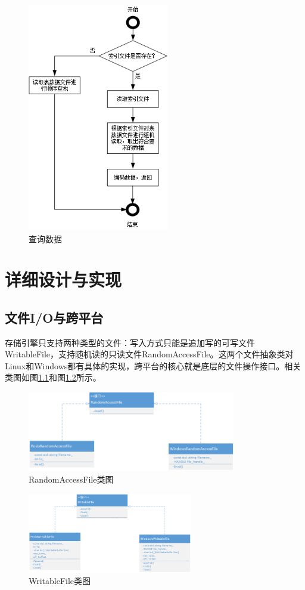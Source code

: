 \documentclass[bachelor]{thesis-uestc}
\begin{document}
\begin{figure}[htbp]
	\centering\includegraphics[height=10cm]{images/lookup.png}
	\caption{查询数据}
	\label{fig:lookup}
\end{figure}

\chapter{详细设计与实现}
\section{文件I/O与跨平台}
存储引擎只支持两种类型的文件：写入方式只能是追加写的可写文件WritableFile，支持随机读的只读文件RandomAccessFile。这两个文件抽象类对Linux和Windows都有具体的实现，跨平台的核心就是底层的文件操作接口。相关类图如图\ref{fig:randonaccessfile}和图\ref{fig:writablefile}所示。

\begin{figure}[htbp]
	\centering\includegraphics[height=3.5cm]{images/randomaccessfile.png}
	\caption{RandomAccessFile类图}
	\label{fig:randonaccessfile}
\end{figure}

\begin{figure}[htbp]
	\centering\includegraphics[height=3.5cm]{images/writablefile.png}
	\caption{WritableFile类图}
	\label{fig:writablefile}
\end{figure}
\end{document}
